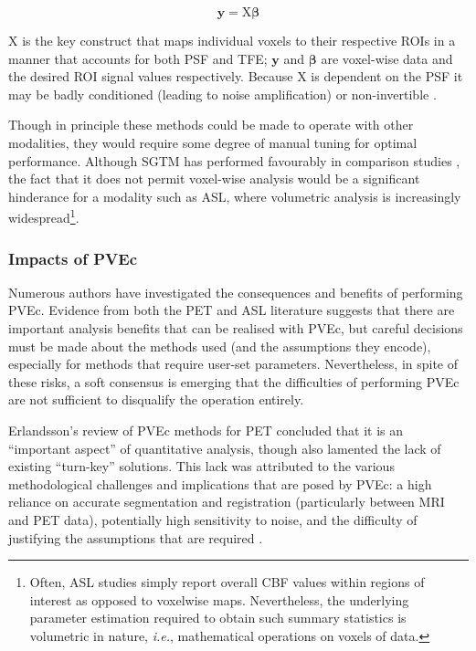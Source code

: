 \documentclass[12pt]{report}
\newcommand{\mat}[1]{\mathrm{#1}}
\renewcommand{\vec}[1]{\mathbf{#1}}
\begin{document}
\begin{equation}
\vec{y} = \mat{X}\vec{\beta}
\end{equation}

$\mat{X}$ is the key construct that maps individual voxels to their respective ROIs in a manner that accounts for both PSF and TFE; $\vec{y}$ and $\vec{\beta}$ are voxel-wise data and the desired ROI signal values respectively. Because $\mat{X}$ is dependent on the PSF it may be badly conditioned (leading to noise amplification) or non-invertible \cite{Greve2016}. 

Though in principle these methods could be made to operate with other modalities, they would require some degree of manual tuning for optimal performance. Although SGTM has performed favourably in comparison studies \cite{Greve2016}, the fact that it does not permit voxel-wise analysis would be a significant hinderance for a modality such as ASL, where volumetric analysis is increasingly widespread\footnote{Often, ASL studies simply report overall CBF values within regions of interest as opposed to voxelwise maps. Nevertheless, the underlying parameter estimation required to obtain such summary statistics is volumetric in nature, \textit{i.e.}, mathematical operations on voxels of data.}.

\subsubsection{Impacts of PVEc}

Numerous authors have investigated the consequences and benefits of performing PVEc. Evidence from both the PET and ASL literature suggests that there are important analysis benefits that can be realised with PVEc, but careful decisions must be made about the methods used (and the assumptions they encode), especially for methods that require user-set parameters. Nevertheless, in spite of these risks, a soft consensus is emerging that the difficulties of performing PVEc are not sufficient to disqualify the operation entirely. 

Erlandsson's review of PVEc methods for PET concluded that it is an ``important aspect'' of quantitative analysis, though also lamented the lack of existing ``turn-key'' solutions. This lack was attributed to the various methodological challenges and implications that are posed by PVEc: a high reliance on accurate segmentation and registration (particularly between MRI and PET data), potentially high sensitivity to noise, and the difficulty of justifying the assumptions that are required \cite{Erlandsson2012}.  
\end{document}
